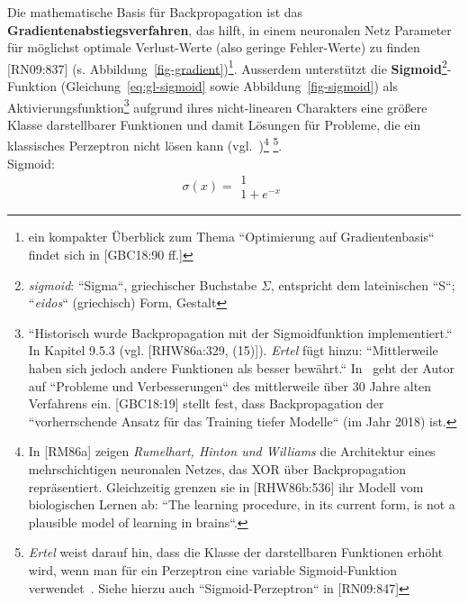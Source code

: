 Die mathematische Basis für Backpropagation ist das \textbf{Gradientenabstiegsverfahren}, das hilft, in einem neuronalen Netz Parameter für möglichst optimale Verlust-Werte (also geringe Fehler-Werte) zu finden [RN09:837] (s. Abbildung~\ref{fig-gradient})\footnote{
    ein kompakter Überblick zum Thema ``Optimierung auf Gradientenbasis`` findet sich in [GBC18:90 ff.]
}.  Ausserdem unterstützt die \textbf{Sigmoid}\footnote{
    \textit{sigmoid}: ``Sigma``, griechischer Buchstabe $\Sigma$, entspricht dem lateinischen ``S``; ``\textit{eidos}`` (griechisch) Form, Gestalt
}-Funktion (Gleichung~\ref{eq:gl-sigmoid} sowie Abbildung~\ref{fig-sigmoid}) als Aktivierungsfunktion\footnote{ ``Historisch wurde Backpropagation mit der Sigmoidfunktion implementiert.``~\cite[314, Fussnote 4]{Ert21b} In Kapitel 9.5.3 (vgl. [RHW86a:329, (15)]). \textit{Ertel} fügt hinzu: ``Mittlerweile haben sich jedoch andere Funktionen als besser bewährt.`` In~\cite[319 f.]{Ert21b} geht der Autor auf ``Probleme und Verbesserungen`` des mittlerweile über 30 Jahre alten Verfahrens ein. [GBC18:19]  stellt fest, dass Backpropagation der ``vorherrschende Ansatz für das Training tiefer Modelle`` (im Jahr 2018) ist.
}  aufgrund ihres nicht-linearen Charakters eine größere Klasse darstellbarer Funktionen und damit Lösungen für Probleme, die ein klassisches Perzeptron nicht lösen kann (vgl.~\cite[316]{Ert21b})\footnote{
    In [RM86a] zeigen \textit{Rumelhart, Hinton und Williams} die Architektur eines mehrschichtigen neuronalen Netzes, das XOR über Backpropagation repräsentiert. Gleichzeitig grenzen sie in [RHW86b:536] ihr Modell vom biologischen Lernen ab: ``The learning procedure, in its current form, is not a plausible model of learning in brains``.
} \footnote{
    \textit{Ertel} weist darauf hin, dass die Klasse der darstellbaren Funktionen erhöht wird, wenn man für ein Perzeptron eine variable Sigmoid-Funktion verwendet~\cite[316]{Ert21b}. Siehe hierzu auch ``Sigmoid-Perzeptron`` in [RN09:847]
}.\\

Sigmoid:
\begin{equation}
\sigma(x) = \begin{matrix}1 \\ \hline 1 + e^{-x}\end{matrix}
\label{eq:gl-sigmoid}
\end{equation}



